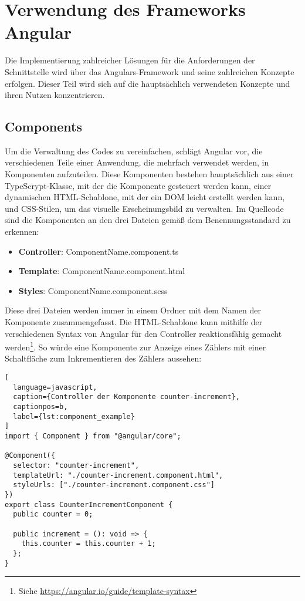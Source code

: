 \section{Verwendung des Frameworks Angular} \label{sec:angular}

Die Implementierung zahlreicher Lösungen für die Anforderungen der Schnittstelle wird über das Angulars-Framework und seine zahlreichen Konzepte erfolgen.
Dieser Teil wird sich auf die hauptsächlich verwendeten Konzepte und ihren Nutzen konzentrieren.

\subsection{Components}

Um die Verwaltung des Codes zu vereinfachen, schlägt Angular vor, die verschiedenen Teile einer Anwendung, die mehrfach verwendet werden, in Komponenten aufzuteilen.
Diese Komponenten bestehen hauptsächlich aus einer TypeScrypt-Klasse, mit der die Komponente gesteuert werden kann, einer dynamischen HTML-Schablone, mit der ein \ac{DOM} leicht erstellt werden kann, und CSS-Stilen, um das visuelle Erscheinungsbild zu verwalten.
Im Quellcode sind die Komponenten an den drei Dateien gemäß dem Benennungsstandard zu erkennen:

\begin{itemize}
  \item \textbf{Controller}: ComponentName.component.ts
  \item \textbf{Template}: ComponentName.component.html
  \item \textbf{Styles}: ComponentName.component.scss
\end{itemize}

Diese drei Dateien werden immer in einem Ordner mit dem Namen der Komponente zusammengefasst.
Die HTML-Schablone kann mithilfe der verschiedenen Syntax von Angular für den Controller reaktionsfähig gemacht werden\footnote{Siehe \href{https://angular.io/guide/template-syntax}{https://angular.io/guide/template-syntax}}.
So würde eine Komponente zur Anzeige eines Zählers mit einer Schaltfläche zum Inkrementieren des Zählers aussehen:

\begin{lstlisting}[
  language=javascript,
  caption={Controller der Komponente counter-increment},
  captionpos=b,
  label={lst:component_example}
]
import { Component } from "@angular/core";

@Component({
  selector: "counter-increment",
  templateUrl: "./counter-increment.component.html",
  styleUrls: ["./counter-increment.component.css"]
})
export class CounterIncrementComponent {
  public counter = 0;

  public increment = (): void => {
    this.counter = this.counter + 1;
  };
}
\end{lstlisting}

